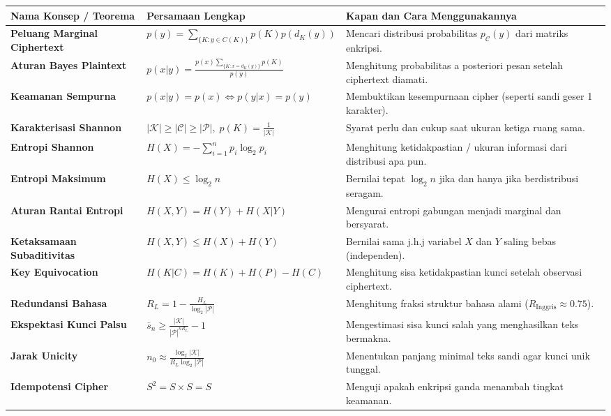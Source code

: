 \documentclass[11pt,a4paper]{article}
\begin{document}
\begin{table}[H]
\centering
\renewcommand{\arraystretch}{1.55}
\begin{tabular}{p{3.8cm} p{5.8cm} p{6.2cm}}
\toprule
\textbf{Nama Konsep / Teorema} & \textbf{Persamaan Lengkap} & \textbf{Kapan dan Cara Menggunakannya} \\
\midrule
\textbf{Peluang Marginal Ciphertext} & $p(y) = \sum_{\{K : y \in C(K)\}} p(K) p(d_K(y))$ & Mencari distribusi probabilitas $p_{\mathcal{C}}(y)$ dari matriks enkripsi. \\
\textbf{Aturan Bayes Plaintext} & $p(x|y) = \frac{p(x) \sum_{\{K : x = d_K(y)\}} p(K)}{p(y)}$ & Menghitung probabilitas a posteriori pesan setelah ciphertext diamati. \\
\textbf{Keamanan Sempurna} & $p(x|y) = p(x) \iff p(y|x) = p(y)$ & Membuktikan kesempurnaan cipher (seperti sandi geser 1 karakter). \\
\textbf{Karakterisasi Shannon} & $|\mathcal{K}| \ge |\mathcal{C}| \ge |\mathcal{P}|, \; p(K) = \frac{1}{|\mathcal{K}|}$ & Syarat perlu dan cukup saat ukuran ketiga ruang sama. \\
\textbf{Entropi Shannon} & $H(X) = -\sum_{i=1}^n p_i \log_2 p_i$ & Menghitung ketidakpastian / ukuran informasi dari distribusi apa pun. \\
\textbf{Entropi Maksimum} & $H(X) \le \log_2 n$ & Bernilai tepat $\log_2 n$ jika dan hanya jika berdistribusi seragam. \\
\textbf{Aturan Rantai Entropi} & $H(X, Y) = H(Y) + H(X|Y)$ & Mengurai entropi gabungan menjadi marginal dan bersyarat. \\
\textbf{Ketaksamaan Subaditivitas} & $H(X, Y) \le H(X) + H(Y)$ & Bernilai sama j.h.j variabel $X$ dan $Y$ saling bebas (independen). \\
\textbf{Key Equivocation} & $H(K|C) = H(K) + H(P) - H(C)$ & Menghitung sisa ketidakpastian kunci setelah observasi ciphertext. \\
\textbf{Redundansi Bahasa} & $R_L = 1 - \frac{H_L}{\log_2 |\mathcal{P}|}$ & Menghitung fraksi struktur bahasa alami ($R_{\text{Inggris}} \approx 0.75$). \\
\textbf{Ekspektasi Kunci Palsu} & $\bar{s}_n \ge \frac{|\mathcal{K}|}{|\mathcal{P}|^{n R_L}} - 1$ & Mengestimasi sisa kunci salah yang menghasilkan teks bermakna. \\
\textbf{Jarak Unicity} & $n_0 \approx \frac{\log_2 |\mathcal{K}|}{R_L \log_2 |\mathcal{P}|}$ & Menentukan panjang minimal teks sandi agar kunci unik tunggal. \\
\textbf{Idempotensi Cipher} & $S^2 = S \times S = S$ & Menguji apakah enkripsi ganda menambah tingkat keamanan. \\
\bottomrule
\end{tabular}
\end{table}
\end{document}
